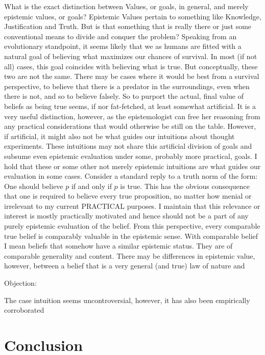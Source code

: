 \documentclass[12pt,numbers=noenddot]{scrartcl}
\begin{document}
What is the exact distinction between Values, or goals, in general, and merely epistemic values, or goals? Epistemic Values pertain to something like Knowledge, Justification and Truth. But is that something that is really there or just some conventional means to divide and conquer the problem? Speaking from an evolutionary standpoint, it seems likely that we as humans are fitted with a natural goal of believing what maximizes our chances of survival. In most (if not all) cases, this goal coincides with believing what is true. But conceptually, these two are not the same. There may be cases where it would be best from a survival perspective, to believe that there is a predator in the surroundings, even when there is not, and so to believe falsely. So to purport the actual, final value of beliefs as being true seems, if nor fat-fetched, at least somewhat artificial. It is a very useful distinction, however, as the epistemologist can free her reasoning from any practical considerations that would otherwise be still on the table. However, if artificial, it might also not be what guides our intuitions about thought experiments. These intuitions may not share this artificial division of goals and subsume even epistemic evaluation under some, probably more practical, goals. I hold that these or some other not merely epistemic intuitions are what guides our evaluation in some cases. Consider a standard reply to a truth norm of the form: One should believe $p$ if and only if $p$ is true. This has the obvious consequence that one is required to believe every true proposition, no matter how menial or irrelevant to my current PRACTICAL purposes. I maintain that this relevance or interest is mostly practically motivated and hence should not be a part of any purely epistemic evaluation of the belief. From this perspective, every comparable true belief is comparably valuable in the epistemic sense. With comparable belief I mean beliefs that somehow have a similar epistemic status. They are of comparable generality and content. There may be differences in epistemic value, however, between a belief that is a very general (and true) law of nature and

Objection: 

The case intuition seems uncontroversial, however, it has also been empirically corroborated \textcite{Andow2016}
\section{Conclusion}


\printbibliography
\end{document}
